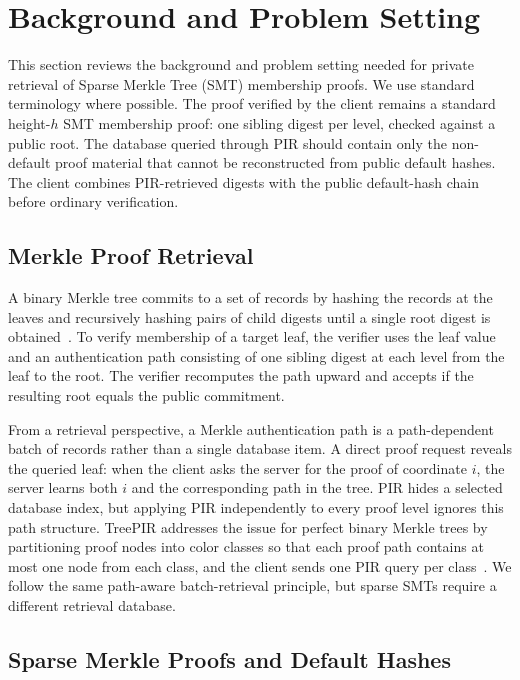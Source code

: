 \section{Background and Problem Setting}
\label{sec:background}

This section reviews the background and problem setting needed for private retrieval of Sparse Merkle Tree (SMT) membership proofs. We use standard terminology where possible. The proof verified by the client remains a standard height-$h$ SMT membership proof: one sibling digest per level, checked against a public root. The database queried through PIR should contain only the non-default proof material that cannot be reconstructed from public default hashes. The client combines PIR-retrieved digests with the public default-hash chain before ordinary verification.

\subsection{Merkle Proof Retrieval}

A binary Merkle tree commits to a set of records by hashing the records at the leaves and recursively hashing pairs of child digests until a single root digest is obtained~\cite{merkle}. To verify membership of a target leaf, the verifier uses the leaf value and an authentication path consisting of one sibling digest at each level from the leaf to the root. The verifier recomputes the path upward and accepts if the resulting root equals the public commitment.

From a retrieval perspective, a Merkle authentication path is a path-dependent batch of records rather than a single database item. A direct proof request reveals the queried leaf: when the client asks the server for the proof of coordinate $i$, the server learns both $i$ and the corresponding path in the tree. PIR hides a selected database index, but applying PIR independently to every proof level ignores this path structure. TreePIR addresses the issue for perfect binary Merkle trees by partitioning proof nodes into color classes so that each proof path contains at most one node from each class, and the client sends one PIR query per class~\cite{treepir}. We follow the same path-aware batch-retrieval principle, but sparse SMTs require a different retrieval database.

\subsection{Sparse Merkle Proofs and Default Hashes}

